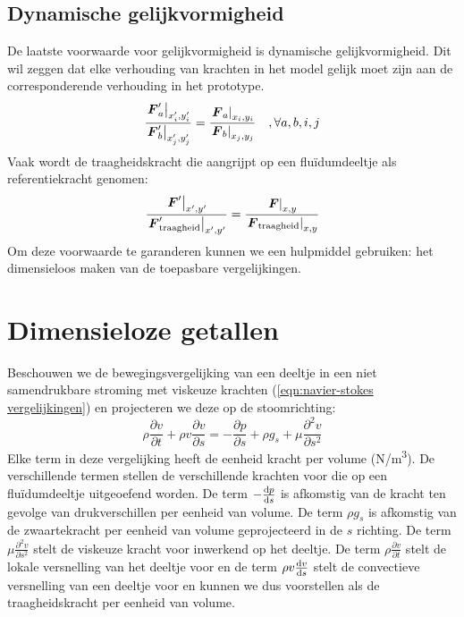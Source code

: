 	\subsection{Dynamische gelijkvormigheid}
De laatste voorwaarde voor gelijkvormigheid is dynamische gelijkvormigheid. Dit wil zeggen dat elke verhouding van krachten in het model gelijk moet zijn aan de corresponderende verhouding in het prototype.
\begin{equation}
	\dfrac{\left. \boldsymbol{F}'_a \right|_{x_i',y_i'}}{\left. \boldsymbol{F}'_b \right|_{x_j',y_j'}} = \dfrac{\left. \boldsymbol{F}_a \right|_{x_i,y_i}}{\left. \boldsymbol{F}_b \right|_{x_j,y_j}} \quad, \forall a,b,i,j
	\label{eqn:dynamische gelijkvormigheid}
\end{equation}
Vaak wordt de traagheidskracht die aangrijpt op een fluïdumdeeltje als referentiekracht genomen:
\begin{equation}
	\dfrac{\left. \boldsymbol{F}' \right|_{x',y'}}{\left. \boldsymbol{F}'_{\text{traagheid}} \right|_{x',y'}} = \dfrac{\left. \boldsymbol{F} \right|_{x,y}}{\left. \boldsymbol{F}_{\text{traagheid}} \right|_{x,y}}
	\label{eqn:dynamische gelijkvormigheid traagheid}
\end{equation}
Om deze voorwaarde te garanderen kunnen we een hulpmiddel gebruiken: het dimensieloos maken van de toepasbare vergelijkingen.

	\section{Dimensieloze getallen}
Beschouwen we de bewegingsvergelijking van een deeltje in een niet samendrukbare stroming met viskeuze krachten (\ref{eqn:navier-stokes vergelijkingen}) en projecteren we deze op de stoomrichting:
\begin{equation}
	\rho \frac{\partial v}{\partial t} + \rho v \frac{\partial v}{\partial s} = -\frac{\partial p}{\partial s} + \rho g_s + \mu \frac{\partial^2 v}{\partial s^2}
	\label{eqn:navier-stokes geprojecteerd}
\end{equation}
Elke term in deze vergelijking heeft de eenheid kracht per volume (\unit{N/m^3}). De verschillende termen stellen de verschillende krachten voor die op een fluïdumdeeltje uitgeoefend worden. De term $-\frac{\mathrm{d} p}{\mathrm{d} s}$ is afkomstig van de kracht ten gevolge van drukverschillen per eenheid van volume. De term $\rho g_s$ is afkomstig van de zwaartekracht per eenheid van volume geprojecteerd in de $s$ richting. De term $\mu \frac{\partial^2 v}{\partial s^2}$ stelt de viskeuze kracht voor inwerkend op het deeltje. De term $\rho \frac{\partial v}{\partial t}$ stelt de lokale versnelling van het deeltje voor en de term $\rho v \frac{\mathrm{d} v}{\mathrm{d} s}$ stelt de convectieve versnelling van een deeltje voor en kunnen we dus voorstellen als de traagheidskracht per eenheid van volume.

